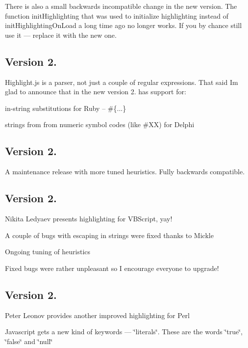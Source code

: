 There is also a small backwards incompatible change in the new version. The function init\+Highlighting that was used to initialize highlighting instead of init\+Highlighting\+On\+Load a long time ago no longer works. If you by chance still use it — replace it with the new one.

\subsection*{Version 2.}

Highlight.\+js is a parser, not just a couple of regular expressions. That said I\textquotesingle{}m glad to announce that in the new version 2. has support for\+:


\begin{DoxyItemize}
\item in-\/string substitutions for Ruby -- {\ttfamily \#\{...\}}
\item strings from from numeric symbol codes (like \#\+XX) for Delphi
\end{DoxyItemize}

\subsection*{Version 2.}

A maintenance release with more tuned heuristics. Fully backwards compatible.

\subsection*{Version 2.}


\begin{DoxyItemize}
\item Nikita Ledyaev presents highlighting for V\+B\+Script, yay!
\item A couple of bugs with escaping in strings were fixed thanks to Mickle
\item Ongoing tuning of heuristics
\end{DoxyItemize}

Fixed bugs were rather unpleasant so I encourage everyone to upgrade!

\subsection*{Version 2.}


\begin{DoxyItemize}
\item Peter Leonov provides another improved highlighting for Perl
\item Javascript gets a new kind of keywords — \char`\"{}literals\char`\"{}. These are the words \char`\"{}true\char`\"{}, \char`\"{}false\char`\"{} and \char`\"{}null\char`\"{}
\end{DoxyItemize}

